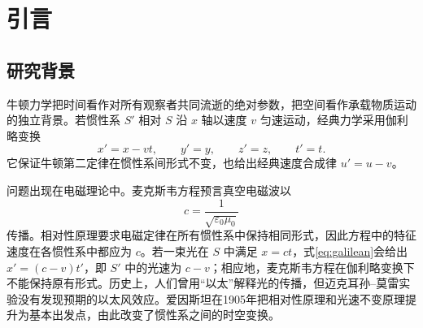 \documentclass[style=classic,color=full]{lc-article}
\begin{document}
\maketitle
\begin{abstract}
狭义相对论改变了经典力学中关于时间、空间和物理量变换的基本认识。本文从时空均匀性、空间各向同性、相对性原理以及光速不变原理出发，推导洛伦兹变换及其四维几何结构，并讨论四维张量、洛伦兹群、李代数、旋量表示和庞加莱对称性。文章由三维运动学扩展到四维速度、四维力、角动量、自旋和 Pauli--Lubanski 四矢量，以 Fermi--Walker 输运定义加速观察者的非自转标架，并介绍 Rindler 坐标、相对论刚性及相关思想实验。协变电动力学部分通过作用量推出洛伦兹力和麦克斯韦方程，分析均匀电磁场中的粒子轨迹、Li\'enard--Wiechert 推迟场及相对论辐射，并以电磁场、尘埃和完美流体的能量--动量张量表述局域守恒。文章还利用洛伦兹不变量讨论二体衰变、散射和反应阈值，结合多类实验考察相对论依据，最后以固有时泛函、经典悖论和 G\^ateaux 变分讨论世界线、因果结构与自由粒子运动。
\end{abstract}
\tableofcontents
\newpage
\section{引言}

\subsection{研究背景}

牛顿力学把时间看作对所有观察者共同流逝的绝对参数，把空间看作承载物质运动的独立背景。若惯性系 $S'$ 相对 $S$ 沿 $x$ 轴以速度 $v$ 匀速运动，经典力学采用伽利略变换
\begin{equation}
  x'=x-vt,\qquad y'=y,\qquad z'=z,\qquad t'=t.
  \label{eq:galilean}
\end{equation}
它保证牛顿第二定律在惯性系间形式不变，也给出经典速度合成律 $u'=u-v$。

问题出现在电磁理论中。麦克斯韦方程预言真空电磁波以
\begin{equation}
  c=\frac{1}{\sqrt{\varepsilon_0\mu_0}}
\end{equation}
传播\cite{griffiths}。相对性原理要求电磁定律在所有惯性系中保持相同形式，因此方程中的特征速度在各惯性系中都应为 $c$。若一束光在 $S$ 中满足 $x=ct$，式\eqref{eq:galilean}会给出 $x'=(c-v)t'$，即 $S'$ 中的光速为 $c-v$；相应地，麦克斯韦方程在伽利略变换下不能保持原有形式。历史上，人们曾用“以太”解释光的传播，但迈克耳孙--莫雷实验没有发现预期的以太风效应\cite{michelson1887}。爱因斯坦在1905年把相对性原理和光速不变原理提升为基本出发点\cite{einstein1905}，由此改变了惯性系之间的时空变换。
\end{document}
